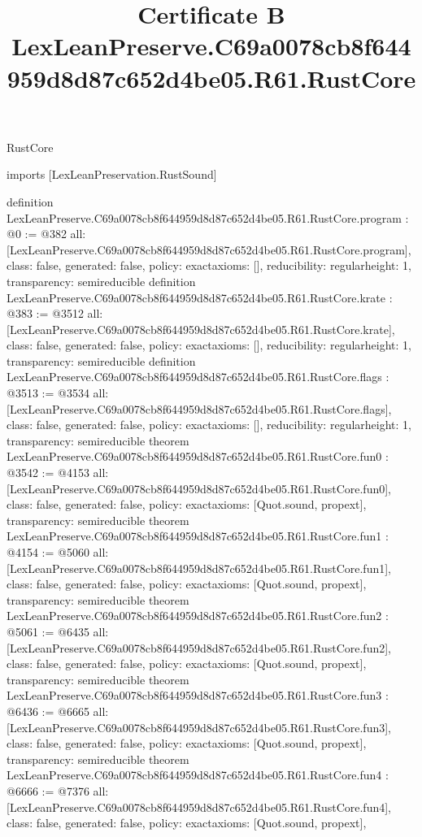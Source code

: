 \begin{lexlean}{RustCore}
\title{Certificate B LexLeanPreserve.C69a0078cb8f644959d8d87c652d4be05.R61.RustCore}
\begin{coremodule}
imports [LexLeanPreservation.RustSound]

definition LexLeanPreserve.C69a0078cb8f644959d8d87c652d4be05.R61.RustCore.program : @0 := @382 {
  all: [LexLeanPreserve.C69a0078cb8f644959d8d87c652d4be05.R61.RustCore.program],
  class: false,
  generated: false,
  policy: exact{axioms: []},
  reducibility: regular{height: 1},
  transparency: semireducible
}
definition LexLeanPreserve.C69a0078cb8f644959d8d87c652d4be05.R61.RustCore.krate : @383 := @3512 {
  all: [LexLeanPreserve.C69a0078cb8f644959d8d87c652d4be05.R61.RustCore.krate],
  class: false,
  generated: false,
  policy: exact{axioms: []},
  reducibility: regular{height: 1},
  transparency: semireducible
}
definition LexLeanPreserve.C69a0078cb8f644959d8d87c652d4be05.R61.RustCore.flags : @3513 := @3534 {
  all: [LexLeanPreserve.C69a0078cb8f644959d8d87c652d4be05.R61.RustCore.flags],
  class: false,
  generated: false,
  policy: exact{axioms: []},
  reducibility: regular{height: 1},
  transparency: semireducible
}
theorem LexLeanPreserve.C69a0078cb8f644959d8d87c652d4be05.R61.RustCore.fun0 : @3542 := @4153 {
  all: [LexLeanPreserve.C69a0078cb8f644959d8d87c652d4be05.R61.RustCore.fun0],
  class: false,
  generated: false,
  policy: exact{axioms: [Quot.sound, propext]},
  transparency: semireducible
}
theorem LexLeanPreserve.C69a0078cb8f644959d8d87c652d4be05.R61.RustCore.fun1 : @4154 := @5060 {
  all: [LexLeanPreserve.C69a0078cb8f644959d8d87c652d4be05.R61.RustCore.fun1],
  class: false,
  generated: false,
  policy: exact{axioms: [Quot.sound, propext]},
  transparency: semireducible
}
theorem LexLeanPreserve.C69a0078cb8f644959d8d87c652d4be05.R61.RustCore.fun2 : @5061 := @6435 {
  all: [LexLeanPreserve.C69a0078cb8f644959d8d87c652d4be05.R61.RustCore.fun2],
  class: false,
  generated: false,
  policy: exact{axioms: [Quot.sound, propext]},
  transparency: semireducible
}
theorem LexLeanPreserve.C69a0078cb8f644959d8d87c652d4be05.R61.RustCore.fun3 : @6436 := @6665 {
  all: [LexLeanPreserve.C69a0078cb8f644959d8d87c652d4be05.R61.RustCore.fun3],
  class: false,
  generated: false,
  policy: exact{axioms: [Quot.sound, propext]},
  transparency: semireducible
}
theorem LexLeanPreserve.C69a0078cb8f644959d8d87c652d4be05.R61.RustCore.fun4 : @6666 := @7376 {
  all: [LexLeanPreserve.C69a0078cb8f644959d8d87c652d4be05.R61.RustCore.fun4],
  class: false,
  generated: false,
  policy: exact{axioms: [Quot.sound, propext]},
}
\end{coremodule}
\end{lexlean}
